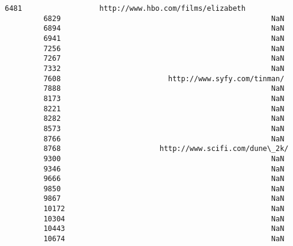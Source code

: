 \documentclass[11pt]{article}
\begin{document}
\begin{Verbatim}[commandchars=\\\{\}]
         6481                  http://www.hbo.com/films/elizabeth   
         6829                                                 NaN   
         6894                                                 NaN   
         6941                                                 NaN   
         7256                                                 NaN   
         7267                                                 NaN   
         7332                                                 NaN   
         7608                         http://www.syfy.com/tinman/   
         7888                                                 NaN   
         8173                                                 NaN   
         8221                                                 NaN   
         8282                                                 NaN   
         8573                                                 NaN   
         8766                                                 NaN   
         8768                       http://www.scifi.com/dune\_2k/   
         9300                                                 NaN   
         9346                                                 NaN   
         9666                                                 NaN   
         9850                                                 NaN   
         9867                                                 NaN   
         10172                                                NaN   
         10304                                                NaN   
         10443                                                NaN   
         10674                                                NaN   
         

\end{Verbatim}
\end{document}

